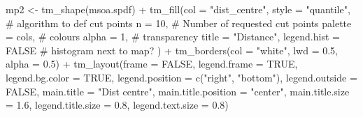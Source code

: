 \documentclass[
  letterpaper,
]{scrbook}
\newenvironment{Shaded}{\begin{snugshade}}{\end{snugshade}}
\newcommand{\AttributeTok}[1]{\textcolor[rgb]{0.40,0.45,0.13}{#1}}
\newcommand{\CommentTok}[1]{\textcolor[rgb]{0.37,0.37,0.37}{#1}}
\newcommand{\ConstantTok}[1]{\textcolor[rgb]{0.56,0.35,0.01}{#1}}
\newcommand{\DecValTok}[1]{\textcolor[rgb]{0.68,0.00,0.00}{#1}}
\newcommand{\FloatTok}[1]{\textcolor[rgb]{0.68,0.00,0.00}{#1}}
\newcommand{\FunctionTok}[1]{\textcolor[rgb]{0.28,0.35,0.67}{#1}}
\newcommand{\NormalTok}[1]{\textcolor[rgb]{0.00,0.23,0.31}{#1}}
\newcommand{\OtherTok}[1]{\textcolor[rgb]{0.00,0.23,0.31}{#1}}
\newcommand{\SpecialCharTok}[1]{\textcolor[rgb]{0.37,0.37,0.37}{#1}}
\newcommand{\StringTok}[1]{\textcolor[rgb]{0.13,0.47,0.30}{#1}}
\begin{document}
\begin{Shaded}
\begin{Highlighting}[]
\NormalTok{mp2 }\OtherTok{\textless{}{-}}  \FunctionTok{tm\_shape}\NormalTok{(msoa.spdf) }\SpecialCharTok{+} 
  \FunctionTok{tm\_fill}\NormalTok{(}\AttributeTok{col =} \StringTok{"dist\_centre"}\NormalTok{, }
          \AttributeTok{style =} \StringTok{"quantile"}\NormalTok{, }\CommentTok{\# algorithm to def cut points}
          \AttributeTok{n =} \DecValTok{10}\NormalTok{, }\CommentTok{\# Number of requested cut points}
          \AttributeTok{palette =}\NormalTok{ cols, }\CommentTok{\# colours}
          \AttributeTok{alpha =} \DecValTok{1}\NormalTok{, }\CommentTok{\# transparency }
          \AttributeTok{title =} \StringTok{"Distance"}\NormalTok{, }
          \AttributeTok{legend.hist =} \ConstantTok{FALSE} \CommentTok{\# histogram next to map?}
\NormalTok{          ) }\SpecialCharTok{+}
  \FunctionTok{tm\_borders}\NormalTok{(}\AttributeTok{col =} \StringTok{"white"}\NormalTok{, }\AttributeTok{lwd =} \FloatTok{0.5}\NormalTok{, }\AttributeTok{alpha =} \FloatTok{0.5}\NormalTok{) }\SpecialCharTok{+}
  \FunctionTok{tm\_layout}\NormalTok{(}\AttributeTok{frame =} \ConstantTok{FALSE}\NormalTok{,}
            \AttributeTok{legend.frame =} \ConstantTok{TRUE}\NormalTok{, }\AttributeTok{legend.bg.color =} \ConstantTok{TRUE}\NormalTok{,}
            \AttributeTok{legend.position =} \FunctionTok{c}\NormalTok{(}\StringTok{"right"}\NormalTok{, }\StringTok{"bottom"}\NormalTok{),}
            \AttributeTok{legend.outside =} \ConstantTok{FALSE}\NormalTok{,}
            \AttributeTok{main.title =} \StringTok{"Dist centre"}\NormalTok{, }
            \AttributeTok{main.title.position =} \StringTok{"center"}\NormalTok{,}
            \AttributeTok{main.title.size =} \FloatTok{1.6}\NormalTok{,}
            \AttributeTok{legend.title.size =} \FloatTok{0.8}\NormalTok{,}
            \AttributeTok{legend.text.size =} \FloatTok{0.8}\NormalTok{)}



\end{Highlighting}
\end{Shaded}
\end{document}
